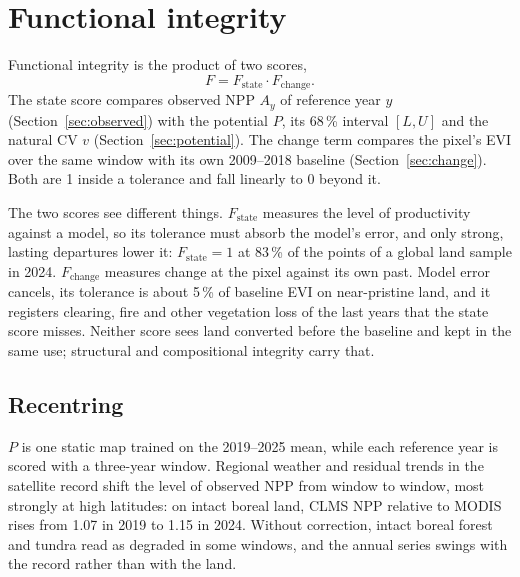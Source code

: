 \documentclass[11pt,a4paper]{article}
\begin{document}
\section{Functional integrity}
\label{sec:functional}

Functional integrity is the product of two scores,
\begin{equation}
F = F_{\text{state}} \cdot F_{\text{change}}.
\end{equation}
The state score compares observed NPP $A_y$ of reference year $y$ (Section~\ref{sec:observed})
with the potential $P$, its 68\,\% interval $[L, U]$ and the natural CV $v$
(Section~\ref{sec:potential}). The change term compares the pixel's EVI over the same window with
its own 2009--2018 baseline (Section~\ref{sec:change}). Both are 1 inside a tolerance and fall
linearly to 0 beyond it.

The two scores see different things. $F_{\text{state}}$ measures the level of productivity
against a model, so its tolerance must absorb the model's error, and only strong, lasting
departures lower it: $F_{\text{state}} = 1$ at 83\,\% of the points of a global land sample in
2024. $F_{\text{change}}$
measures change at the pixel against its own past. Model error cancels, its tolerance is about
5\,\% of baseline EVI on near-pristine land, and it registers clearing, fire and other vegetation
loss of the last years that the state score misses. Neither score sees land converted before the
baseline and kept in the same use; structural and compositional integrity carry that.

\subsection{Recentring}
\label{sec:recentring}

$P$ is one static map trained on the 2019--2025 mean, while each reference year is scored with a
three-year window. Regional weather and residual trends in the satellite record shift the level
of observed NPP from window to window, most strongly at high latitudes: on intact boreal land,
CLMS NPP relative to MODIS rises from 1.07 in 2019 to 1.15 in 2024. Without correction, intact
boreal forest and tundra read as degraded in some windows, and the annual series swings with the
record rather than with the land.
\end{document}
